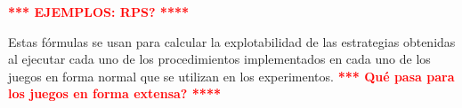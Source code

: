\noindent\textcolor{red}{\bf **** EJEMPLOS: RPS? ****}

Estas fórmulas se usan para calcular la explotabilidad de las estrategias obtenidas al ejecutar cada uno de los procedimientos implementados en cada uno de los juegos en forma normal que se utilizan en los experimentos. \textcolor{red}{\bf **** Qué pasa para los juegos en forma extensa? ****}



